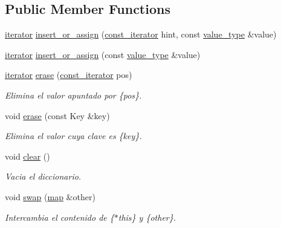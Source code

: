 \subsection*{Public Member Functions}
\begin{DoxyCompactItemize}
\item 
\hyperlink{classaed2_1_1iterator_1_1iterator}{iterator} \hyperlink{classaed2_1_1iterator_aab34e7001b3ee3ce79da8ea24d7e6351}{insert\+\_\+or\+\_\+assign} (\hyperlink{classaed2_1_1iterator_1_1const__iterator}{const\+\_\+iterator} hint, const \hyperlink{classaed2_1_1iterator_a6411a2c08b2b7c52f063bef1a168acb6}{value\+\_\+type} \&value)
\item 
\hyperlink{classaed2_1_1iterator_1_1iterator}{iterator} \hyperlink{classaed2_1_1iterator_af131c4b0d89978372a0c8ce38bf8f33e}{insert\+\_\+or\+\_\+assign} (const \hyperlink{classaed2_1_1iterator_a6411a2c08b2b7c52f063bef1a168acb6}{value\+\_\+type} \&value)
\item 
\hyperlink{classaed2_1_1iterator_1_1iterator}{iterator} \hyperlink{classaed2_1_1iterator_adf371aaec9e68bd4a4d5a889d0b6b679}{erase} (\hyperlink{classaed2_1_1iterator_1_1const__iterator}{const\+\_\+iterator} pos)
\begin{DoxyCompactList}\small\item\em Elimina el valor apuntado por \{pos\}. \end{DoxyCompactList}\item 
void \hyperlink{classaed2_1_1iterator_a0a0e62b2a2c0fb98f431164c66a6e388}{erase} (const Key \&key)
\begin{DoxyCompactList}\small\item\em Elimina el valor cuya clave es \{key\}. \end{DoxyCompactList}\item 
void \hyperlink{classaed2_1_1iterator_ac98b533e402839c99d33d3118906c38f}{clear} ()
\begin{DoxyCompactList}\small\item\em Vacia el diccionario. \end{DoxyCompactList}\item 
void \hyperlink{classaed2_1_1iterator_a8ec2215b2dfaf6ddd57b1e0b00d8d3d2}{swap} (\hyperlink{classaed2_1_1map}{map} \&other)
\begin{DoxyCompactList}\small\item\em Intercambia el contenido de \{$\ast$this\} y \{other\}. \end{DoxyCompactList}\end{DoxyCompactItemize}

